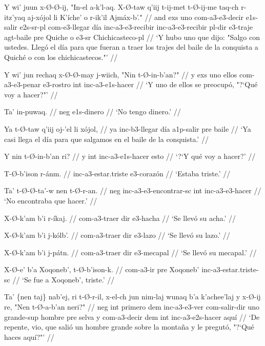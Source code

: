 \documentclass[12pt]{article}
\begin{document}
\ex
\begingl
  \gla Y wi' juun x-\O-\O-ij, "In-el a-k'l-aq. X-\O-taw q'iij t-ij-met t-\O-ij-me taq-ch r-itz'yaq aj-x\'ojol li K'\'iche' o r-ik'il Ajm\'ax-b'." //
  \glb and exs uno com-a3-e3-decir e1s-salir e2s-sr-pl com-e3-llegar d\'ia inc-a3-e3-recibir inc-a3-e3-recibir pl-dir e3-traje agt-baile pre Quiche o e3-sr Chichicasteco-pl //
  \glft `Y hubo uno que dijo: "Salgo con ustedes. Lleg\'o el d\'ia para que fueran a traer los trajes del baile de la conquista a Quich\'e o con los chichicastecos."' //
\endgl
\xe

\ex
\begingl
  \gla  Y wi' jun rechaq x-\O-\O-may j-wiich, "Nin t-\O-in-b'an?" //
  \glb y exs uno ellos com-a3-e3-penar e3-rostro int inc-a3-e1s-hacer //
  \glft `Y uno de ellos se preocup\'o, "?`Qu\'e voy a hacer?"' //
\endgl
\xe


\ex
\begingl
  \gla Ta' in-puwaq. //
  \glb neg e1s-dinero //
  \glft `No tengo dinero.' //
\endgl
\xe

\ex
\begingl
  \gla Ya t-\O-taw q'iij oj-'el li x\'ojol, //
  \glb ya inc-b3-llegar d\'ia a1p-salir pre baile //
  \glft `Ya casi llega el d\'ia para que salgamos en el baile de la conquista.' //
\endgl
\xe

\ex
\begingl
  \gla  Y nin t-\O-in-b'an ri? //
  \glb  y int inc-a3-e1s-hacer esto //
  \glft `?`Y qu\'e voy a hacer?' //
\endgl
\xe

\ex
\begingl
  \gla  T-\O-b'ison r-\'anm. //
  \glb inc-a3-estar.triste e3-coraz\'on //
  \glft `Estaba triste.' //
\endgl
\xe

\ex
\begingl
  \gla  Ta' t-\O-\O-ta'-w nen t-\O-r-an. //
  \glb  neg inc-a3-e3-encontrar-sc int inc-a3-e3-hacer //
  \glft `No encontraba que hacer.' //
\endgl
\xe

\ex
\begingl
  \gla  X-\O-k'am b'i r-\'ikaj. //
  \glb com-a3-traer dir e3-hacha //
  \glft `Se llev\'o su acha.' //
\endgl
\xe

\ex
\begingl
  \gla  X-\O-k'am b'i j-k\'olb'. //
  \glb  com-a3-traer dir e3-lazo //
  \glft `Se llev\'o su lazo.' //
\endgl
\xe

\ex
\begingl
  \gla  X-\O-k'am b'i j-p\'atn. //
  \glb com-a3-traer dir e3-mecapal //
  \glft `Se llev\'o su mecapal.' //
\endgl
\xe

\ex
\begingl
  \gla  X-\O-e' b'a Xoqoneb', t-\O-b'ison-k. //
  \glb com-a3-ir pre Xoqoneb' inc-a3-estar.triste-sc //
  \glft `Se fue a Xoqoneb', triste.' //
\endgl
\xe

\ex
\begingl
  \gla  Ta' \{nen taj\} nab'ej, ri t-\O-r-il, x-el-ch jun nim-laj wunaq b'a k'achee'laj y x-\O-ij re, "Nen t-\O-a-b'an neri?" //
  \glb  neg int primero dem inc-a3-e3-ver com-salir-dir uno grande-sup hombre pre selva y com-a3-decir dem int inc-a3-e2s-hacer aqu\'i //
  \glft `De repente, vio, que sali\'o un hombre grande sobre la monta\~na y le pregut\'o, "?`Qu\'e haces aqu\'i?"' //
\endgl
\xe
\end{document}
